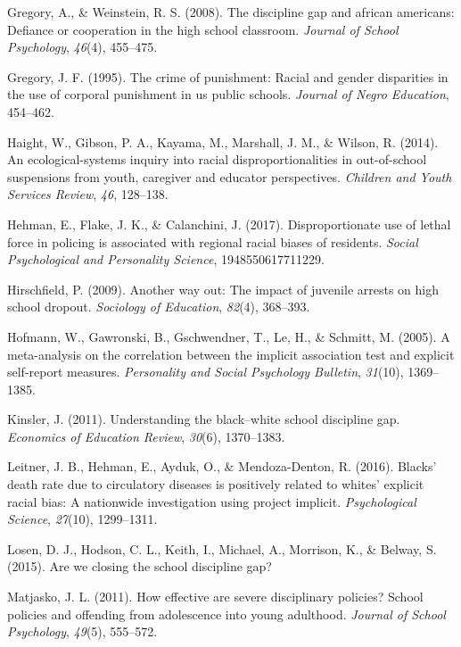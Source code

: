 \documentclass[english,floatsintext,man]{apa6}
\theoremstyle{definition}
\theoremstyle{definition}
\theoremstyle{remark}
\begin{document}
\hypertarget{ref-gregory2008discipline}{}
Gregory, A., \& Weinstein, R. S. (2008). The discipline gap and african
americans: Defiance or cooperation in the high school classroom.
\emph{Journal of School Psychology}, \emph{46}(4), 455--475.

\hypertarget{ref-gregory1995crime}{}
Gregory, J. F. (1995). The crime of punishment: Racial and gender
disparities in the use of corporal punishment in us public schools.
\emph{Journal of Negro Education}, 454--462.

\hypertarget{ref-haight2014ecological}{}
Haight, W., Gibson, P. A., Kayama, M., Marshall, J. M., \& Wilson, R.
(2014). An ecological-systems inquiry into racial disproportionalities
in out-of-school suspensions from youth, caregiver and educator
perspectives. \emph{Children and Youth Services Review}, \emph{46},
128--138.

\hypertarget{ref-hehman2017disproportionate}{}
Hehman, E., Flake, J. K., \& Calanchini, J. (2017). Disproportionate use
of lethal force in policing is associated with regional racial biases of
residents. \emph{Social Psychological and Personality Science},
1948550617711229.

\hypertarget{ref-hirschfield2009another}{}
Hirschfield, P. (2009). Another way out: The impact of juvenile arrests
on high school dropout. \emph{Sociology of Education}, \emph{82}(4),
368--393.

\hypertarget{ref-hofmann2005meta}{}
Hofmann, W., Gawronski, B., Gschwendner, T., Le, H., \& Schmitt, M.
(2005). A meta-analysis on the correlation between the implicit
association test and explicit self-report measures. \emph{Personality
and Social Psychology Bulletin}, \emph{31}(10), 1369--1385.

\hypertarget{ref-kinsler2011understanding}{}
Kinsler, J. (2011). Understanding the black--white school discipline
gap. \emph{Economics of Education Review}, \emph{30}(6), 1370--1383.

\hypertarget{ref-leitner2016blacks}{}
Leitner, J. B., Hehman, E., Ayduk, O., \& Mendoza-Denton, R. (2016).
Blacks' death rate due to circulatory diseases is positively related to
whites' explicit racial bias: A nationwide investigation using project
implicit. \emph{Psychological Science}, \emph{27}(10), 1299--1311.

\hypertarget{ref-losen2015we}{}
Losen, D. J., Hodson, C. L., Keith, I., Michael, A., Morrison, K., \&
Belway, S. (2015). Are we closing the school discipline gap?

\hypertarget{ref-matjasko2011effective}{}
Matjasko, J. L. (2011). How effective are severe disciplinary policies?
School policies and offending from adolescence into young adulthood.
\emph{Journal of School Psychology}, \emph{49}(5), 555--572.
\end{document}
